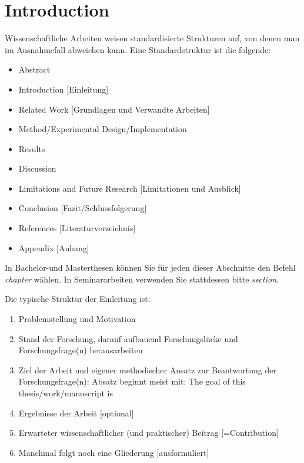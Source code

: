 \chapter{Introduction} \label{chap:introduction}

Wissenschaftliche Arbeiten weisen standardisierte Strukturen auf, von denen man im Ausnahmefall abweichen kann. Eine Standardstruktur ist die folgende:
\begin{itemize}
  \item Abstract
  \item Introduction [Einleitung]
  \item Related Work [Grundlagen und Verwandte Arbeiten]
  \item Method/Experimental Design/Implementation
  \item Results
  \item Discussion
  \item Limitations and Future Research [Limitationen und Ausblick]
  \item Conclusion [Fazit/Schlussfolgerung]
  \item References [Literaturverzeichnis]
  \item Appendix [Anhang]
\end{itemize}

In Bachelor-und Masterthesen können Sie für jeden dieser Abschnitte den Befehl \emph{chapter} wählen. In Seminararbeiten verwenden Sie stattdessen bitte \emph{section}.

Die typische Struktur der Einleitung ist:
\begin{enumerate}
  \item Problemstellung und Motivation
  \item Stand der Forschung, darauf aufbauend Forschungslücke und Forschungsfrage(n) herausarbeiten
  \item Ziel der Arbeit und eigener methodischer Ansatz zur Beantwortung der Forschungsfrage(n): Absatz beginnt meist mit: The goal of this thesis/work/manuscript is
  \item Ergebnisse der Arbeit [optional]
  \item Erwarteter wissenschaftlicher (und praktischer) Beitrag [=Contribution]
  \item Manchmal folgt noch eine Gliederung [ausformuliert]
\end{enumerate}

